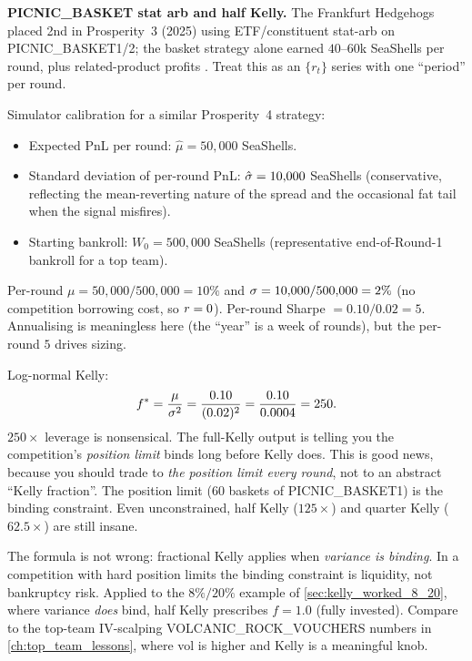 \begin{prosperitybox}
\textbf{PICNIC\_BASKET stat arb and half Kelly.} The Frankfurt
Hedgehogs placed 2nd in Prosperity~3 (2025) using ETF/constituent
stat-arb on PICNIC\_BASKET1/2; the basket strategy alone earned
$40$--$60$k SeaShells per round, plus related-product profits
\citep{frankfurthedgehogs2025}. Treat this as an $\{r_t\}$ series
with one ``period'' per round.

Simulator calibration for a similar Prosperity~4 strategy:
\begin{itemize}
  \item Expected PnL per round: $\hat\mu = 50{,}000$ SeaShells.
  \item Standard deviation of per-round PnL: $\hat{\sigma} =
  10{,}000$ SeaShells (conservative, reflecting the
  mean-reverting nature of the spread and the occasional fat
  tail when the signal misfires).
  \item Starting bankroll: $W_0 = 500{,}000$ SeaShells
  (representative end-of-Round-1 bankroll for a top team).
\end{itemize}
Per-round $\mu = 50{,}000/500{,}000 = 10\%$ and $\sigma =
10{,}000/500{,}000 = 2\%$ (no competition borrowing cost, so
$r = 0$). Per-round Sharpe $= 0.10/0.02 = 5$. Annualising is
meaningless here (the ``year'' is a week of rounds), but
the per-round $5$ drives sizing.

Log-normal Kelly:
\begin{equation}
  f^{*} = \frac{\mu}{\sigma^2} = \frac{0.10}{(0.02)^2}
  = \frac{0.10}{0.0004} = 250.
\end{equation}
$250\times$ leverage is nonsensical. The full-Kelly output is
telling you the competition's \emph{position limit} binds long
before Kelly does. This is good news, because you should trade to
\emph{the position limit every round}, not to an abstract
``Kelly fraction''. The position limit ($60$ baskets of
PICNIC\_BASKET1) is the binding constraint. Even unconstrained,
half Kelly ($125\times$) and quarter Kelly ($62.5\times$) are
still insane.

The formula is not wrong: fractional Kelly applies when
\emph{variance is binding}. In a competition with hard position
limits the binding constraint is liquidity, not bankruptcy risk.
Applied to the $8\%/20\%$ example of
\cref{sec:kelly_worked_8_20}, where variance \emph{does} bind,
half Kelly prescribes $f = 1.0$ (fully invested). Compare to the
top-team IV-scalping VOLCANIC\_ROCK\_VOUCHERS numbers in
\cref{ch:top_team_lessons}, where vol is higher and Kelly is a
meaningful knob.
\end{prosperitybox}

